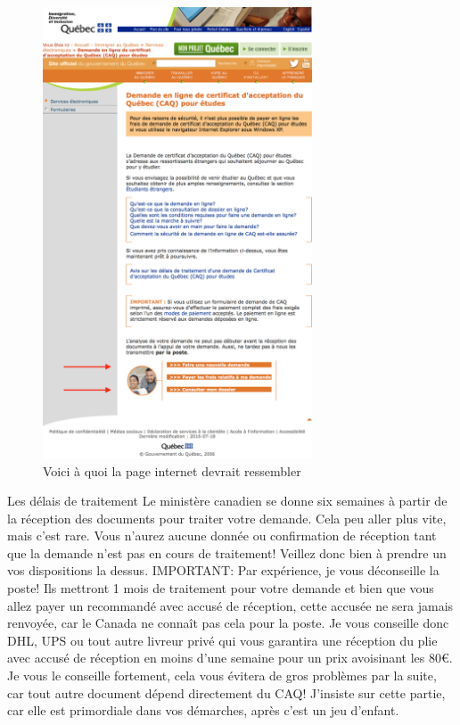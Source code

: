\begin{figure}[h!]
\centering
\includegraphics[width = 80mm]{figures/Site_CAQ}
\caption{Voici à quoi la page internet devrait ressembler}
\end{figure}


\begin{example}{Les délais de traitement}
  Le ministère canadien se donne six semaines à partir de la réception des documents pour traiter votre demande. Cela peu aller plus vite, mais c’est rare. Vous n’aurez aucune donnée ou confirmation de réception tant que la demande n’est pas en cours de traitement! Veillez donc bien à prendre un vos dispositions la dessus.
  IMPORTANT: Par expérience, je vous déconseille la poste! Ils mettront 1 mois de traitement pour votre demande et bien que vous allez payer un recommandé avec accusé de réception, cette accusée ne sera jamais renvoyée, car le Canada ne connaît pas cela pour la poste.
  Je vous conseille donc DHL, UPS ou tout autre livreur privé qui vous garantira une réception du plie avec accusé de réception en moins d’une semaine pour un prix avoisinant les 80\euro{}. Je vous le conseille fortement, cela vous évitera de gros problèmes par la suite, car tout autre document dépend directement du CAQ!
  J’insiste sur cette partie, car elle est primordiale dans vos démarches, après c’est un jeu d’enfant.
\end{example}

